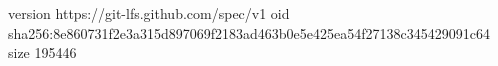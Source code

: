 version https://git-lfs.github.com/spec/v1
oid sha256:8e860731f2e3a315d897069f2183ad463b0e5e425ea54f27138c345429091c64
size 195446
